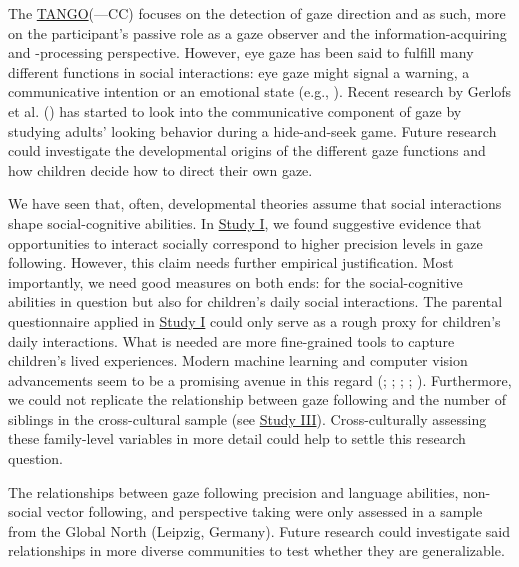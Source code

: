 \documentclass[
]{scrbook}
\begin{document}
The \hyperref[acronyms_TANGO]{TANGO}(---CC) focuses on the detection of gaze direction and as such, more on the participant's passive role as a gaze observer and the information-acquiring and -processing perspective. However, eye gaze has been said to fulfill many different functions in social interactions: eye gaze might signal a warning, a communicative intention or an emotional state (e.g., ). Recent research by Gerlofs et al. () has started to look into the communicative component of gaze by studying adults' looking behavior during a hide-and-seek game. Future research could investigate the developmental origins of the different gaze functions and how children decide how to direct their own gaze.

We have seen that, often, developmental theories assume that social interactions shape social-cognitive abilities. In \hyperref[studyI]{Study I}, we found suggestive evidence that opportunities to interact socially correspond to higher precision levels in gaze following. However, this claim needs further empirical justification. Most importantly, we need good measures on both ends: for the social-cognitive abilities in question but also for children's daily social interactions. The parental questionnaire applied in \hyperref[studyI]{Study I} could only serve as a rough proxy for children's daily interactions. What is needed are more fine-grained tools to capture children's lived experiences. Modern machine learning and computer vision advancements seem to be a promising avenue in this regard (; ; ; ; ). Furthermore, we could not replicate the relationship between gaze following and the number of siblings in the cross-cultural sample (see \hyperref[studyIII]{Study III}). Cross-culturally assessing these family-level variables in more detail could help to settle this research question.

The relationships between gaze following precision and language abilities, non-social vector following, and perspective taking were only assessed in a sample from the Global North (Leipzig, Germany). Future research could investigate said relationships in more diverse communities to test whether they are generalizable.
\end{document}
